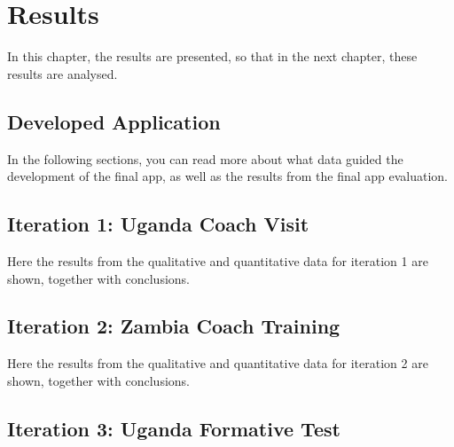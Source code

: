 \chapter{Results}\label{cha:Research}
%


In this chapter, the results are presented, so that in the next chapter, these results are analysed. %

%

\section{Developed Application}\label{developed-application}

  

In the following sections, you can read more about what data guided the development of the final app, as well as the results from the final app evaluation.

\section{Iteration 1: Uganda Coach Visit}

Here the results from the qualitative and quantitative data for iteration 1 are shown, together with conclusions.





\section{Iteration 2: Zambia Coach Training}

Here the results from the qualitative and quantitative data for iteration 2 are shown, together with conclusions.





\section{Iteration 3: Uganda Formative Test}

